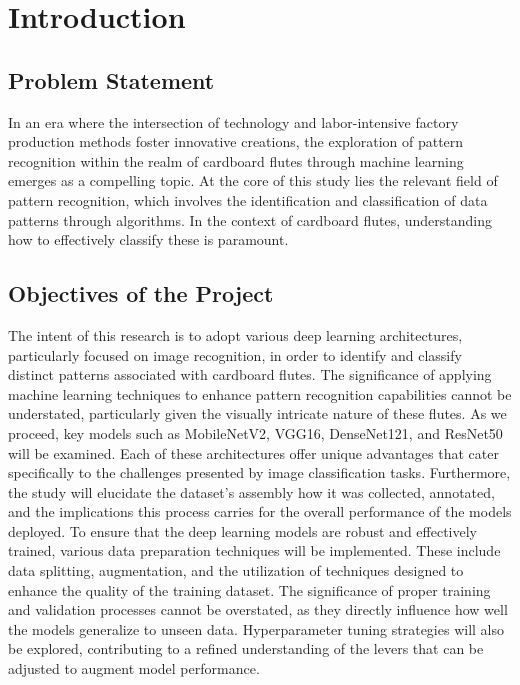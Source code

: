 \chapter{Introduction}
\label{c:intro}
 
\section{Problem Statement}

In an era where the intersection of technology and labor-intensive factory production methods foster innovative creations, the exploration of pattern recognition within the realm of cardboard flutes through machine learning emerges as a compelling topic. At the core of this study lies the relevant field of pattern recognition, which involves the identification and classification of data patterns through algorithms. In the context of cardboard flutes, understanding how to effectively classify these is paramount.

\section{Objectives of the Project}


The intent of this research is to adopt various deep learning architectures, particularly focused on image recognition, in order to identify and classify distinct patterns associated with cardboard flutes. The significance of applying machine learning techniques to enhance pattern recognition capabilities cannot be understated, particularly given the visually intricate nature of these flutes. As we proceed, key models such as MobileNetV2, VGG16, DenseNet121, and ResNet50 will be examined. Each of these architectures offer unique advantages that cater specifically to the challenges presented by image classification tasks. Furthermore, the study will elucidate the dataset's assembly how it was collected, annotated, and the implications this process carries for the overall performance of the models deployed. To ensure that the deep learning models are robust and effectively trained, various data preparation techniques will be implemented. These include data splitting, augmentation, and the utilization of techniques designed to enhance the quality of the training dataset. The significance of proper training and validation processes cannot be overstated, as they directly influence how well the models generalize to unseen data. Hyperparameter tuning strategies will also be explored, contributing to a refined understanding of the levers that can be adjusted to augment model performance.

